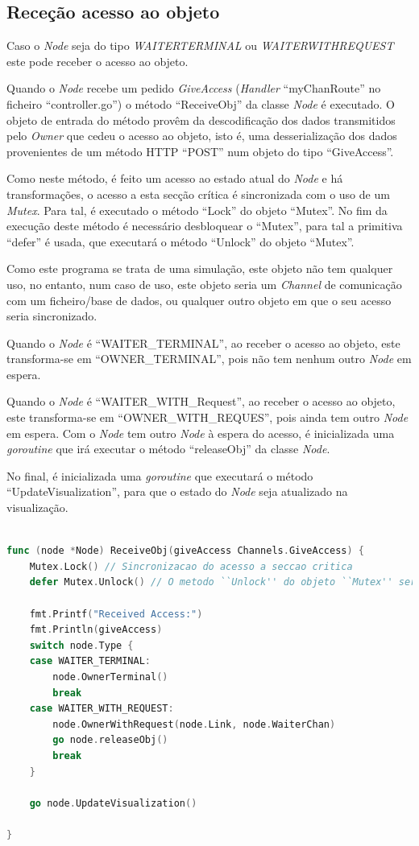 \subsection*{Receção acesso ao objeto}
Caso o \emph{Node} seja do tipo \emph{WAITER\textunderscore TERMINAL} ou \emph{WAITER\textunderscore WITH\textunderscore REQUEST}
este pode receber o acesso ao objeto.

Quando o \emph{Node} recebe um pedido \emph{GiveAccess} (\emph{Handler} ``myChanRoute'' no ficheiro ``controller.go'') o
método ``ReceiveObj'' da classe \emph{Node} é executado.
O objeto de entrada do método provêm da descodificação dos dados transmitidos pelo \emph{Owner}
que cedeu o acesso ao objeto, isto é, uma desserialização dos dados provenientes de um método \acs{HTTP} ``POST''
num objeto do tipo ``GiveAccess''.


Como neste método, é feito um acesso ao estado atual do \emph{Node} e há transformações, 
o acesso a esta secção crítica é sincronizada com o uso de um \emph{Mutex}.
Para tal, é executado o método ``Lock'' do objeto ``Mutex''.
No fim da execução deste método é necessário desbloquear o ``Mutex'', para tal 
a primitiva ``defer'' é usada, que executará o método ``Unlock'' do objeto ``Mutex''.

Como este programa se trata de uma simulação, este objeto não tem qualquer uso,
no entanto, num caso de uso,
este objeto seria um \emph{Channel} de comunicação com um ficheiro/base de dados, ou qualquer outro
objeto em que o seu acesso seria sincronizado.


Quando o \emph{Node} é ``WAITER\_TERMINAL'', ao receber o acesso ao objeto,
este transforma-se em ``OWNER\_TERMINAL'', pois não tem nenhum outro \emph{Node} em espera.


Quando o \emph{Node} é ``WAITER\_WITH\_Request'', ao receber o acesso ao objeto,
este transforma-se em ``OWNER\_WITH\_REQUES'', pois ainda tem outro \emph{Node} em espera.
Com o \emph{Node} tem outro \emph{Node} à espera do acesso, é inicializada uma \emph{goroutine}
que irá executar o método ``releaseObj'' da classe \emph{Node}.


No final, é inicializada uma \emph{goroutine} que executará 
o método ``UpdateVisualization'', para que o estado do \emph{Node}
seja atualizado na visualização.


\begin{lstlisting}[caption={Método ``ReceiveObj''},language=Go]

func (node *Node) ReceiveObj(giveAccess Channels.GiveAccess) {
	Mutex.Lock() // Sincronizacao do acesso a seccao critica
	defer Mutex.Unlock() // O metodo ``Unlock'' do objeto ``Mutex'' sera executado caso o metodo ``Request'' termine

	fmt.Printf("Received Access:")
	fmt.Println(giveAccess)
	switch node.Type {
	case WAITER_TERMINAL:
		node.OwnerTerminal()
		break
	case WAITER_WITH_REQUEST:
		node.OwnerWithRequest(node.Link, node.WaiterChan)
		go node.releaseObj()
		break
	}

	go node.UpdateVisualization()

}

\end{lstlisting}

